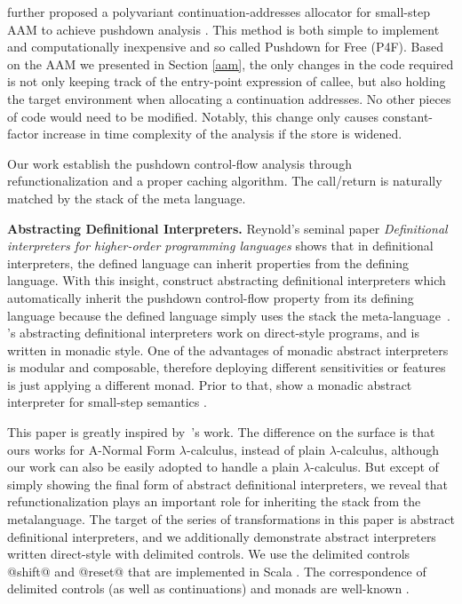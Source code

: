 \documentclass[acmsmall]{acmart}\settopmatter{}
\begin{document}
\citeauthor{gilray2016pushdown} further proposed a polyvariant continuation-addresses allocator
for small-step AAM to achieve pushdown analysis \cite{gilray2016pushdown}.
This method is both simple to implement and computationally inexpensive and so called Pushdown for Free (P4F).
Based on the AAM we presented in Section \ref{aam}, the only changes in the code required is
not only keeping track of the entry-point expression of callee, but also holding the target
environment when allocating a continuation addresses.
No other pieces of code would need to be modified.
Notably, this change only causes constant-factor increase in time complexity of
the analysis if the store is widened.

Our work establish the pushdown control-flow analysis through refunctionalization and a
proper caching algorithm. The call/return is naturally matched by the stack of 
the meta language.

\textbf{Abstracting Definitional Interpreters.}
Reynold's seminal paper \emph{Definitional interpreters for higher-order
  programming languages} \cite{reynolds1972definitional} shows that in
definitional interpreters, the defined language can inherit properties from the defining language.
With this insight, \citeauthor{darais2017abstracting} construct abstracting
definitional interpreters which automatically inherit the pushdown control-flow
property from its defining language
because the defined language simply uses the stack the
meta-language~\cite{darais2017abstracting}. \citeauthor{darais2017abstracting}'s abstracting
definitional interpreters work on direct-style programs, and is written in monadic style. One
of the advantages of monadic abstract interpreters is modular and composable, therefore
deploying different sensitivities or features is just applying a different monad.
Prior to that, \citeauthor{Sergey:2013:MAI:2491956.2491979} show a monadic
abstract interpreter for small-step semantics \cite{Sergey:2013:MAI:2491956.2491979}.

This paper is greatly inspired by~\citeauthor{darais2017abstracting}'s work.
The difference on the surface is that ours works for A-Normal Form $\lambda$-calculus,
instead of plain $\lambda$-calculus, although our work can also be easily adopted to handle a plain
$\lambda$-calculus.
But except of simply showing the final form of abstract definitional interpreters,
we reveal that refunctionalization plays an important role for inheriting the
stack from the metalanguage.
The target of the series of transformations in this paper is abstract definitional
interpreters, and we additionally demonstrate abstract interpreters written direct-style with
delimited controls. 
We use the delimited controls @shift@ and @reset@ that are implemented in Scala \cite{rompf2009implementing}.
The correspondence of delimited controls (as well as continuations) and monads
are well-known \cite{Danvy:1990:AC:91556.91622, wadler1992essence, danvy1992representing, moggi1991notions}.
\end{document}
